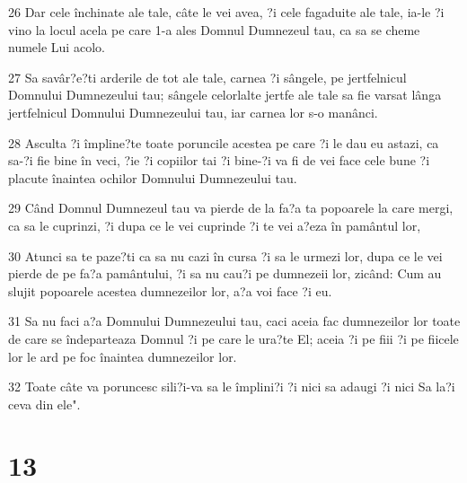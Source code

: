 \par 26 Dar cele închinate ale tale, câte le vei avea, ?i cele fagaduite ale tale, ia-le ?i vino la locul acela pe care 1-a ales Domnul Dumnezeul tau, ca sa se cheme numele Lui acolo.
\par 27 Sa savâr?e?ti arderile de tot ale tale, carnea ?i sângele, pe jertfelnicul Domnului Dumnezeului tau; sângele celorlalte jertfe ale tale sa fie varsat lânga jertfelnicul Domnului Dumnezeului tau, iar carnea lor s-o manânci.
\par 28 Asculta ?i împline?te toate poruncile acestea pe care ?i le dau eu astazi, ca sa-?i fie bine în veci, ?ie ?i copiilor tai ?i bine-?i va fi de vei face cele bune ?i placute înaintea ochilor Domnului Dumnezeului tau.
\par 29 Când Domnul Dumnezeul tau va pierde de la fa?a ta popoarele la care mergi, ca sa le cuprinzi, ?i dupa ce le vei cuprinde ?i te vei a?eza în pamântul lor,
\par 30 Atunci sa te paze?ti ca sa nu cazi în cursa ?i sa le urmezi lor, dupa ce le vei pierde de pe fa?a pamântului, ?i sa nu cau?i pe dumnezeii lor, zicând: Cum au slujit popoarele acestea dumnezeilor lor, a?a voi face ?i eu.
\par 31 Sa nu faci a?a Domnului Dumnezeului tau, caci aceia fac dumnezeilor lor toate de care se îndeparteaza Domnul ?i pe care le ura?te El; aceia ?i pe fiii ?i pe fiicele lor le ard pe foc înaintea dumnezeilor lor.
\par 32 Toate câte va poruncesc sili?i-va sa le împlini?i ?i nici sa adaugi ?i nici Sa la?i ceva din ele".

\chapter{13}

